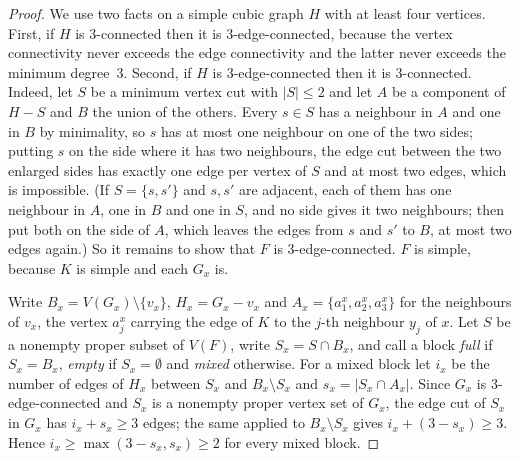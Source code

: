\documentclass[11pt]{article}
\theoremstyle{definition}
\theoremstyle{remark}
\begin{document}
\begin{proof}
We use two facts on a simple cubic graph $H$ with at least four vertices. First, if $H$ is
3-connected then it is 3-edge-connected, because the vertex connectivity never exceeds the edge
connectivity and the latter never exceeds the minimum degree~3. Second, if $H$ is 3-edge-connected
then it is 3-connected. Indeed, let $S$ be a minimum vertex cut with $|S| \le 2$ and let $A$ be a
component of $H - S$ and $B$ the union of the others. Every $s \in S$ has a neighbour in $A$ and one
in $B$ by minimality, so $s$ has at most one neighbour on one of the two sides; putting $s$ on the
side where it has two neighbours, the edge cut between the two enlarged sides has exactly one edge
per vertex of $S$ and at most two edges, which is impossible. (If $S = \{s,s'\}$ and $s,s'$ are
adjacent, each of them has one neighbour in $A$, one in $B$ and one in $S$, and no side gives it two
neighbours; then put both on the side of $A$, which leaves the edges from $s$ and $s'$ to $B$, at most
two edges again.) So it remains to show that $F$ is
3-edge-connected. $F$ is simple, because $K$ is simple and each $G_x$ is.

Write $B_x = V(G_x) \setminus \{v_x\}$, $H_x = G_x - v_x$ and $A_x = \{a^x_1,a^x_2,a^x_3\}$ for the
neighbours of $v_x$, the vertex $a^x_j$ carrying the edge of $K$ to the $j$-th neighbour $y_j$ of
$x$. Let $S$ be a nonempty proper subset of $V(F)$, write $S_x = S \cap B_x$, and call a block
\emph{full} if $S_x = B_x$, \emph{empty} if $S_x = \emptyset$ and \emph{mixed} otherwise. For a mixed
block let $i_x$ be the number of edges of $H_x$ between $S_x$ and $B_x \setminus S_x$ and
$s_x = |S_x \cap A_x|$. Since $G_x$ is 3-edge-connected and $S_x$ is a nonempty proper vertex set of
$G_x$, the edge cut of $S_x$ in $G_x$ has $i_x + s_x \ge 3$ edges; the same applied to
$B_x \setminus S_x$ gives $i_x + (3 - s_x) \ge 3$. Hence $i_x \ge \max(3 - s_x, s_x) \ge 2$ for every
mixed block.


\end{proof}
\end{document}
